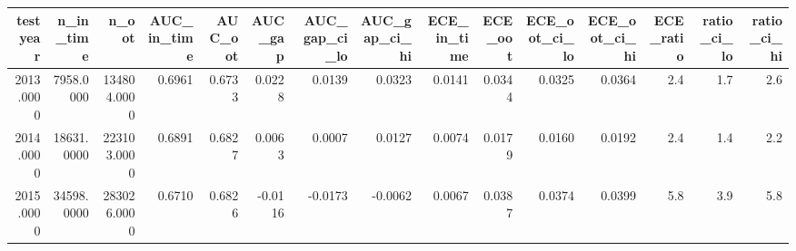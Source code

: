 \begin{tabular}{rrrrrrrrrrrrrrr}
\toprule
test year & n\_in\_time & n\_oot & AUC\_in\_time & AUC\_oot & AUC\_gap & AUC\_gap\_ci\_lo & AUC\_gap\_ci\_hi & ECE\_in\_time & ECE\_oot & ECE\_oot\_ci\_lo & ECE\_oot\_ci\_hi & ECE\_ratio & ratio\_ci\_lo & ratio\_ci\_hi \\
\midrule
2013.0000 & 7958.0000 & 134804.0000 & 0.6961 & 0.6733 & 0.0228 & 0.0139 & 0.0323 & 0.0141 & 0.0344 & 0.0325 & 0.0364 & 2.4 & 1.7 & 2.6 \\
2014.0000 & 18631.0000 & 223103.0000 & 0.6891 & 0.6827 & 0.0063 & 0.0007 & 0.0127 & 0.0074 & 0.0179 & 0.0160 & 0.0192 & 2.4 & 1.4 & 2.2 \\
2015.0000 & 34598.0000 & 283026.0000 & 0.6710 & 0.6826 & -0.0116 & -0.0173 & -0.0062 & 0.0067 & 0.0387 & 0.0374 & 0.0399 & 5.8 & 3.9 & 5.8 \\
\bottomrule
\end{tabular}
